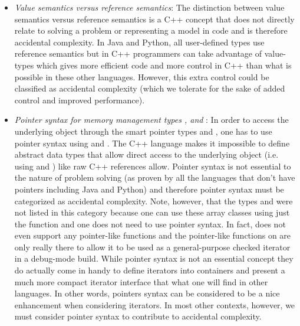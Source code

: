 \documentclass[pdf,ps2pdf,11pt]{SANDreport}
\begin{document}
\begin{itemize}

{}\item\textit{Value semantics versus reference semantics}: The
distinction between value semantics versus reference semantics is a
C++ concept that does not directly relate to solving a problem or
representing a model in code and is therefore accidental complexity.
In Java and Python, all user-defined types use reference semantics but
in C++ programmers can take advantage of value-types which gives more
efficient code and more control in C++ than what is possible in these
other languages.  However, this extra control could be classified as
accidental complexity (which we tolerate for the sake of added control
and improved performance).

{}\item\textit{Pointer syntax for memory management types {},
and {}}: In order to access the underlying object through the
smart pointer types {} and {}, one has to use
pointer syntax using {} and {}.
The C++ language makes it impossible to define abstract data types
that allow direct access to the underlying object (i.e. using
{} and {}) like raw C++ references
allow.  Pointer syntax is not essential to the nature of problem
solving (as proven by all the languages that don't have pointers
including Java and Python) and therefore pointer syntax must be
categorized as accidental complexity.  Note, however, that the types
{} and {} were not listed in this
category because one can use these array classes using just the
{} function and one does not need to use
pointer syntax.  In fact, {} does not even support any
pointer-like functions and the pointer-like functions on
{} are only really there to allow it to be used as a
general-purpose checked iterator in a debug-mode build.  While pointer
syntax is not an essential concept they do actually come in handy to
define iterators into containers and present a much more compact
iterator interface that what one will find in other languages.  In
other words, pointers syntax can be considered to be a nice
enhancement when considering iterators.  In most other contexts,
however, we must consider pointer syntax to contribute to accidental
complexity.

\end{itemize}
\end{document}
